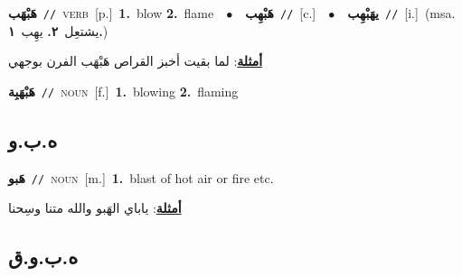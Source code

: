 \documentclass[10pt,a4paper,twoside]{article} %
\begin{document}
\begin{multicols}{2}
{\setlength\topsep{0pt}\textbf{\foreignlanguage{arabic}{هَبْهَب}}\ {\color{gray}\texttt{//}\color{black}}\ \textsc{verb}\ [p.]\ \textbf{1.}~blow  \textbf{2.}~flame\ \ $\bullet$\ \ \setlength\topsep{0pt}\textbf{\foreignlanguage{arabic}{هَبْهِب}}\ {\color{gray}\texttt{//}\color{black}}\ [c.]\ \ $\bullet$\ \ \setlength\topsep{0pt}\textbf{\foreignlanguage{arabic}{يهَبْهِب}}\ {\color{gray}\texttt{//}\color{black}}\ [i.]\ \color{gray}(msa. \foreignlanguage{arabic}{يشتعِل}~\foreignlanguage{arabic}{\textbf{٢.}}  \foreignlanguage{arabic}{يهِب}~\foreignlanguage{arabic}{\textbf{١.}})\color{black}\  \begin{flushright}\color{gray}\foreignlanguage{arabic}{\textbf{\underline{\foreignlanguage{arabic}{أمثلة}}}: لما بقيت أخبز القراص هَبْهَب الفرن بوجهي}\end{flushright}\color{black}} \vspace{2mm}

{\setlength\topsep{0pt}\textbf{\foreignlanguage{arabic}{هَبْهَبِة}}\ {\color{gray}\texttt{//}\color{black}}\ \textsc{noun}\ [f.]\ \textbf{1.}~blowing  \textbf{2.}~flaming\ } \vspace{2mm}

\vspace{-3mm}
\subsection*{\color{blue}\foreignlanguage{arabic}{ه.ب.و}\color{blue}{}} 

{\setlength\topsep{0pt}\textbf{\foreignlanguage{arabic}{هَبو}}\ {\color{gray}\texttt{//}\color{black}}\ \textsc{noun}\ [m.]\ \textbf{1.}~blast of hot air or fire etc.\  \begin{flushright}\color{gray}\foreignlanguage{arabic}{\textbf{\underline{\foreignlanguage{arabic}{أمثلة}}}: ياباي الهَبو والله متنا وسِحنا}\end{flushright}\color{black}} \vspace{2mm}

\vspace{-3mm}
\subsection*{\color{blue}\foreignlanguage{arabic}{ه.ب.و.ق}\color{blue}{}} 


\end{multicols}
\end{document}
